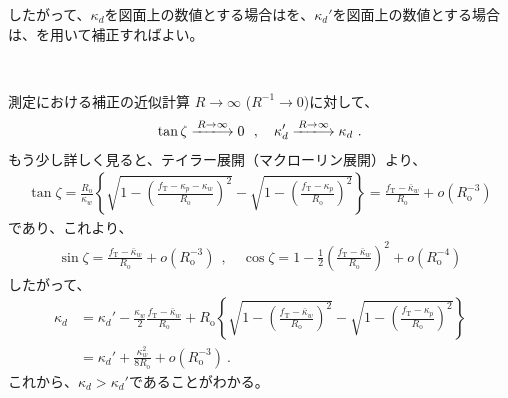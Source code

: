 したがって、$\kappa_d$を図面上の数値とする場合はを、$\kappa_d'$を図面上の数値とする場合は、を用いて補正すればよい。

\clearpage
~\vfill
\begin{\Columnname}{測定における\KeywayDepth 補正の近似計算}
$R\to\infty$ ($R^{-1}\to0$)に対して、
\begin{align*}
  \tan\zeta \xlongrightarrow{R\to\infty} 0~~, \quad
  \kappa_d' \xlongrightarrow{R\to\infty} \kappa_d\ .
\end{align*}
もう少し詳しく見ると、テイラー展開（マクローリン展開）より、
\begin{align*}
  \tan\zeta
  = \frac{R_\mathrm o}{\kappa_w}
     \left\{
     \sqrt{1-\left(\frac{f_\mathrm T-\kappa_p-\kappa_w}{R_\mathrm o}\right)^2}
     -\sqrt{1-\left(\frac{f_\mathrm T-\kappa_p}{R_\mathrm o}\right)^2}
     \right\}
  = \frac{f_\mathrm T-\bar\kappa_w}{R_\mathrm o}+o\left(R_\mathrm o^{-3}\right)
\end{align*}
であり、これより、
\begin{align*}
  \sin\zeta = \frac{f_\mathrm T-\bar\kappa_w}{R_\mathrm o}+o\left(R_\mathrm o^{-3}\right)~~, \quad
  \cos\zeta = 1-\frac12\left(\frac{f_\mathrm T-\bar\kappa_w}{R_\mathrm o}\right)^2
              +o\left(R_\mathrm o^{-4}\right)
\end{align*}
したがって、
\begin{align*}
  \kappa_d
  &= \kappa_d'-\frac{\kappa_w}2\frac{f_\mathrm T-\bar\kappa_w}{R_\mathrm o}
     +R_\mathrm o
      \left\{
      \sqrt{1-\left(\frac{f_\mathrm T-\bar\kappa_w}{R_\mathrm o}\right)^2}
      -\sqrt{1-\left(\frac{f_\mathrm T-\kappa_p}{R_\mathrm o}\right)^2}
      \right\}\\
  &= \kappa_d'+\frac{\kappa_w^2}{8R_\mathrm o}
     +o\left(R_\mathrm o^{-3}\right)\ .
\end{align*}
これから、$\kappa_d > \kappa_d'$であることがわかる。
\end{\Columnname}
